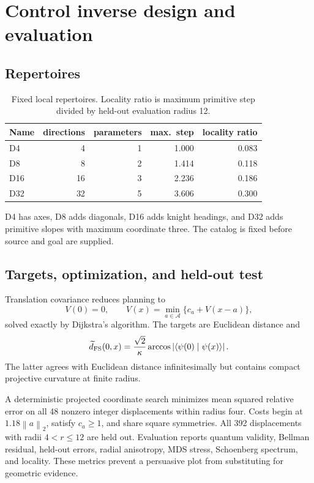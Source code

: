 \documentclass[11pt]{article}
\theoremstyle{definition}\newtheorem{definition}[theorem]{Definition}
\theoremstyle{remark}\newtheorem{remark}[theorem]{Remark}
\newcommand{\braket}[2]{\langle #1\mid #2\rangle}
\newcommand{\norm}[1]{\left\lVert #1\right\rVert}
\newcommand{\abs}[1]{\left\lvert #1\right\rvert}
\begin{document}
\section{Control inverse design and evaluation}
\label{sec:control-method}

\subsection{Repertoires}

\begin{table}[htbp]
\centering
\caption{Fixed local repertoires. Locality ratio is maximum primitive step
divided by held-out evaluation radius 12.}
\label{tab:repertoires}
\begin{tabular}{lrrrr}
\toprule
Name & directions & parameters & max.\ step & locality ratio\\
\midrule
D4 & 4 & 1 & 1.000 & 0.083\\
D8 & 8 & 2 & 1.414 & 0.118\\
D16 & 16 & 3 & 2.236 & 0.186\\
D32 & 32 & 5 & 3.606 & 0.300\\
\bottomrule
\end{tabular}
\end{table}
D4 has axes, D8 adds diagonals, D16 adds knight headings, and D32 adds
primitive slopes with maximum coordinate three. The catalog is fixed before
source and goal are supplied.

\subsection{Targets, optimization, and held-out test}

Translation covariance reduces planning to
\begin{equation}
V(0)=0,\qquad V(x)=\min_{a\in\mathcal A}\{c_a+V(x-a)\},
\label{eq:displacement-bellman}
\end{equation}
solved exactly by Dijkstra's algorithm. The targets are Euclidean distance and
\[
\widetilde d_{\rm FS}(0,x)=\frac{\sqrt2}{\kappa}
\arccos\abs{\braket{\psi(0)}{\psi(x)}}.
\]
The latter agrees with Euclidean distance infinitesimally but contains compact
projective curvature at finite radius.

A deterministic projected coordinate search minimizes mean squared relative
error on all 48 nonzero integer displacements within radius four. Costs begin
at \(1.18\norm a_2\), satisfy \(c_a\ge1\), and share square symmetries. All
392 displacements with radii \(4<r\le12\) are held out. Evaluation reports
quantum validity, Bellman residual, held-out errors, radial anisotropy, MDS
stress, Schoenberg spectrum, and locality. These metrics prevent a persuasive
plot from substituting for geometric evidence.
\end{document}
